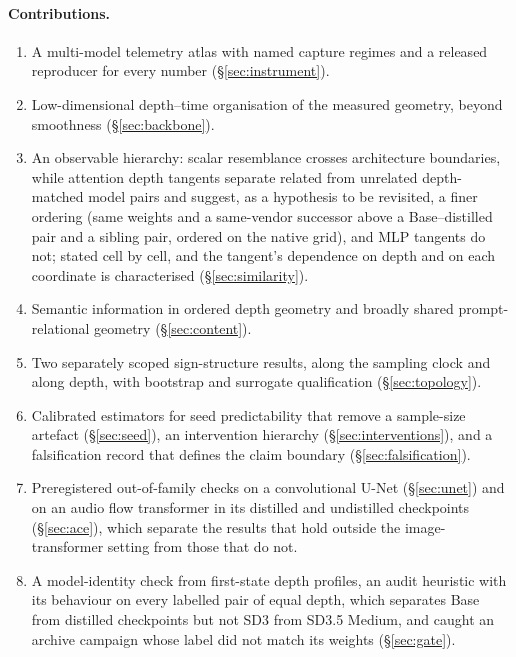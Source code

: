 \documentclass[11pt]{article}
\begin{document}
\paragraph{Contributions.}
\begin{enumerate}
 \item A multi-model telemetry atlas with named capture regimes and a released reproducer for every number (\S\ref{sec:instrument}).
 \item Low-dimensional depth--time organisation of the measured geometry, beyond smoothness (\S\ref{sec:backbone}).
 \item An observable hierarchy: scalar resemblance crosses architecture boundaries, while attention depth tangents separate related from unrelated depth-matched model pairs and suggest, as a hypothesis to be revisited, a finer ordering (same weights and a same-vendor successor above a Base--distilled pair and a sibling pair, ordered on the native grid), and MLP tangents do not; stated cell by cell, and the tangent's dependence on depth and on each coordinate is characterised (\S\ref{sec:similarity}).
 \item Semantic information in ordered depth geometry and broadly shared prompt-relational geometry (\S\ref{sec:content}).
 \item Two separately scoped sign-structure results, along the sampling clock and along depth, with bootstrap and surrogate qualification (\S\ref{sec:topology}).
 \item Calibrated estimators for seed predictability that remove a sample-size artefact (\S\ref{sec:seed}), an intervention hierarchy (\S\ref{sec:interventions}), and a falsification record that defines the claim boundary (\S\ref{sec:falsification}).
 \item Preregistered out-of-family checks on a convolutional U-Net (\S\ref{sec:unet}) and on an audio flow transformer in its distilled and undistilled checkpoints (\S\ref{sec:ace}), which separate the results that hold outside the image-transformer setting from those that do not.
 \item A model-identity check from first-state depth profiles, an audit heuristic with its behaviour on every labelled pair of equal depth, which separates Base from distilled checkpoints but not SD3 from SD3.5 Medium, and caught an archive campaign whose label did not match its weights (\S\ref{sec:gate}).
\end{enumerate}
\end{document}
